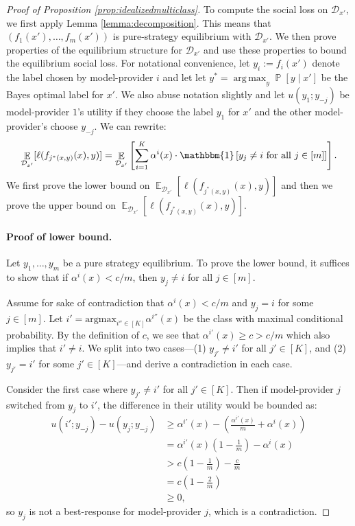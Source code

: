 \documentclass[letterpaper,11pt]{article}
\theoremstyle{plain}
\DeclareMathOperator*{\argmax}{arg\,max}
\DeclareMathOperator*{\E}{\mathbb{E}}
\DeclareMathOperator*{\Prob}{\mathbb{P}}
\begin{document}
\begin{proof}[Proof of Proposition \ref{prop:idealizedmulticlass}]
To compute the social loss on $\mathcal{D}_{x'}$, we first apply Lemma \ref{lemma:decomposition}. This means that $(f_1(x'), \ldots, f_m(x'))$ is pure-strategy equilibrium with $\mathcal{D}_{x'}$. We then prove properties of the equilibrium structure for $\mathcal{D}_{x'}$ and use these properties to bound the equilibrium social loss. For notational convenience, let $y_i := f_i(x')$ denote the label chosen by model-provider $i$ and let 
let $y^* =  \argmax_{y} \Prob[y \mid x']$ be the Bayes optimal label for $x'$. We also abuse notation slightly and let $u(y_1; y_{-j})$ be model-provider $1$'s utility if they choose the label $y_1$ for $x'$ and the other model-provider's choose $y_{-j}$. We can rewrite:
\[\E_{\mathcal{D}_{x'}}[\ell(f_{j^*(x,y)}(x), y)] = \E_{\mathcal{D}_{x'}}\left[\sum_{i=1}^K \alpha^i(x) \cdot \mathbbm{1}\left[y_j \neq i \text{ for all } j \in [m] \right] \right]. \]
We first prove the lower bound on $\E_{\mathcal{D}_{x'}}[\ell(f_{j^*(x,y)}(x), y)]$ and then we prove the upper bound on $\E_{\mathcal{D}_{x'}}[\ell(f_{j^*(x,y)}(x), y)]$.

\paragraph{Proof of lower bound.} Let $y_1, \ldots, y_m$ be a pure strategy equilibrium. To prove the lower bound, it suffices to show that if $\alpha^i(x) < c/m$, then $y_j \neq i$ for all $j \in [m]$. 

Assume for sake of contradiction that $\alpha^i(x) < c/m$ and $y_j = i$ for some $j \in [m]$. Let $i' = \text{argmax}_{i'' \in [K]} \alpha^{i''}(x)$ be the class with maximal conditional probability. By the definition of $c$, we see that $ \alpha^{i'}(x) \ge c > c/m$ which also implies that $i' \neq i$. We split into two cases---(1) $y_{j'} \neq i'$ for all $j' \in [K]$, and (2)  $y_{j'} = i'$ for some $j' \in [K]$---and derive a contradiction in each case.


Consider the first case where $y_{j'} \neq i'$ for all $j' \in [K]$. Then if model-provider $j$ switched from $y_j$ to $i'$, the difference in their utility would be bounded as: 
\begin{align*}
u(i'; y_{-j}) - u(y_j; y_{-j}) &\ge \alpha^{i'}(x) - \left(\frac{\alpha^{i'}(x)}{m} + \alpha^i(x)\right) \\
&= \alpha^{i'}(x) \left(1 - \frac{1}{m} \right) - \alpha^i(x)\\
&> c \left(1 - \frac{1}{m}\right) - \frac{c}{m} \\
&= c \left(1 - \frac{2}{m}\right) \\
&\ge 0,  
\end{align*}
so $y_j$ is not a best-response for model-provider $j$, which is a contradiction. 


\end{proof}
\end{document}
